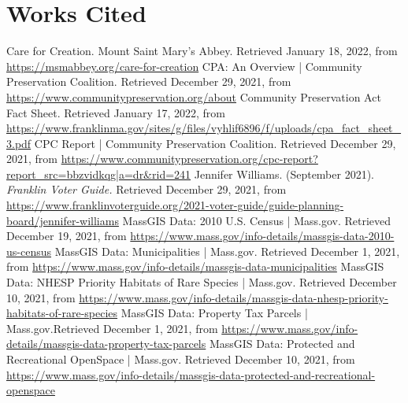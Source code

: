 \documentclass[12pt, stu, floatsintext,table]{apa7}
\begin{document}
\section{Works Cited}
\onehalfspacing
\begin{flushleft}
Care for Creation. Mount Saint Mary’s Abbey. Retrieved January 18, 2022, from \url{https://msmabbey.org/care-for-creation}
\newline
\newline
CPA: An Overview | Community Preservation Coalition. Retrieved December 29, 2021, from \url{https://www.communitypreservation.org/about}  
\newline
\newline
Community Preservation Act Fact Sheet. Retrieved January 17, 2022, from \url{https://www.franklinma.gov/sites/g/files/vyhlif6896/f/uploads/cpa_fact_sheet_3.pdf}
\newline 
\newline
CPC Report | Community Preservation Coalition. Retrieved December 29, 2021, from \url{https://www.communitypreservation.org/cpc-report?report_src=bbzvidkqg|a=dr&rid=241} 
\newline 
\newline
Jennifer Williams. (September 2021). \emph{Franklin Voter Guide.} Retrieved December 29, 2021, from \url{https://www.franklinvoterguide.org/2021-voter-guide/guide-planning-board/jennifer-williams} 
\newline
\newline
MassGIS Data: 2010 U.S. Census | Mass.gov. Retrieved December 19, 2021, from \url{https://www.mass.gov/info-details/massgis-data-2010-us-census}
\newline
\newline
MassGIS Data: Municipalities | Mass.gov.  Retrieved December 1, 2021, from \url{https://www.mass.gov/info-details/massgis-data-municipalities}
\newline
\newline
MassGIS Data: NHESP Priority Habitats of Rare Species | Mass.gov. Retrieved December 10, 2021, from \url{ https://www.mass.gov/info-details/massgis-data-nhesp-priority-habitats-of-rare-species}
\newline
\newline
MassGIS Data: Property Tax Parcels | Mass.gov.Retrieved December 1, 2021, from \url{https://www.mass.gov/info-details/massgis-data-property-tax-parcels}
MassGIS Data: Protected and Recreational OpenSpace | Mass.gov. Retrieved December 10, 2021, from \url{https://www.mass.gov/info-details/massgis-data-protected-and-recreational-openspace}


\end{flushleft}
\end{document}
